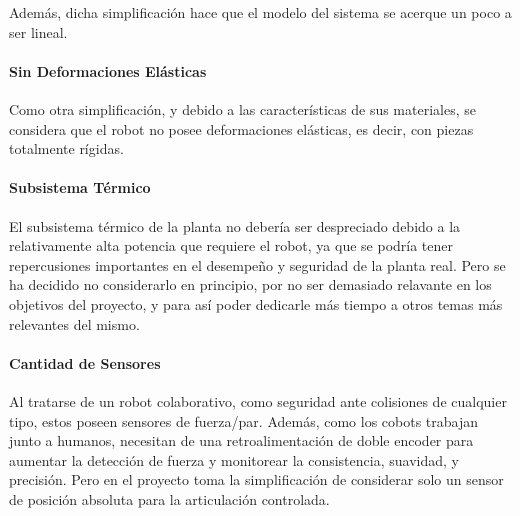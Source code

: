 \documentclass{article}
\begin{document}
\begin{sloppypar}
Además, dicha simplificación hace que el modelo del sistema se acerque un poco a ser lineal.

\paragraph{Sin Deformaciones Elásticas}
\label{sec:Sin Deformaciones Elásticas}
\hfill

Como otra simplificación, y debido a las características de sus materiales, se considera que el robot no posee deformaciones elásticas, es decir, con piezas totalmente rígidas.


\paragraph{Subsistema Térmico}
\label{sec:Subsistema Térmico}
\hfill

\hfill

El subsistema térmico de la planta no debería ser despreciado debido a la relativamente alta potencia que requiere el robot, ya que se podría tener repercusiones importantes en el desempeño y seguridad de la planta real. Pero se ha decidido no considerarlo en principio, por no ser demasiado relavante en los objetivos del proyecto, y para así poder dedicarle más tiempo a otros temas más relevantes del mismo.

\paragraph{Cantidad de Sensores}
\label{sec:Cantidad de Sensores}
\hfill

\hfill

Al tratarse de un robot colaborativo, como seguridad ante colisiones de cualquier tipo, estos poseen sensores de fuerza/par. Además, como los cobots trabajan junto a humanos, necesitan de una retroalimentación de doble encoder para aumentar la detección de fuerza y monitorear la consistencia, suavidad, y precisión.
Pero en el proyecto toma la simplificación de considerar solo un sensor de posición absoluta para la articulación controlada.






\end{sloppypar}
\end{document}
